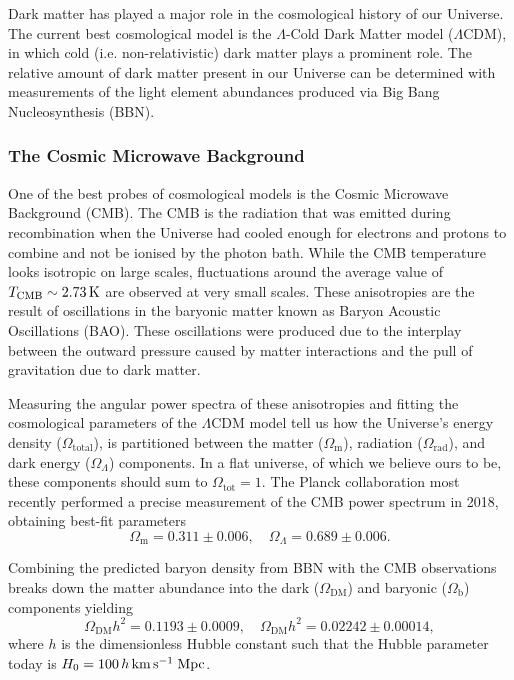 Dark matter has played a major role in the cosmological history of our Universe. The current best cosmological model is the $\Lambda$-Cold Dark Matter model ($\Lambda$CDM), in which cold (i.e. non-relativistic) dark matter plays a prominent role. The relative amount of dark matter present in our Universe can be determined with measurements of the light element abundances produced via Big Bang Nucleosynthesis (BBN).

\subsubsection*{The Cosmic Microwave Background}
One of the best probes of cosmological models is the Cosmic Microwave Background (CMB). The CMB is the radiation that was emitted during recombination when the Universe had cooled enough for electrons and protons to combine and not be ionised by the photon bath. While the CMB temperature looks isotropic on large scales, fluctuations around the average value of $T_\mathrm{CMB} \sim 2.73{\rm \,K}$ are observed at very small scales. 
These anisotropies are the result of oscillations in the baryonic matter known as Baryon Acoustic Oscillations (BAO). These oscillations were produced due to the interplay between the outward pressure caused by matter interactions and the pull of gravitation due to dark matter. 

Measuring the angular power spectra of these anisotropies and fitting the cosmological parameters of the $\Lambda$CDM model tell us how the Universe's energy density ($\Omega_\mathrm{total}$), is partitioned between the matter ($\Omega_\mathrm{m}$), radiation  ($\Omega_\mathrm{rad}$), and dark energy  ($\Omega_\Lambda$) components. In a flat universe, of which we believe ours to be, these components should sum to $\Omega_\mathrm{tot} = 1$.
The Planck collaboration most recently performed a precise measurement of the CMB power spectrum in 2018, obtaining best-fit parameters
\begin{equation}
    \Omega_\mathrm{m} = 0.311 \pm 0.006,\quad \Omega_\Lambda = 0.689 \pm 0.006.
\end{equation}

Combining the predicted baryon density from BBN with the CMB observations breaks down the matter abundance into the dark ($\Omega_\mathrm{DM}$)  and baryonic ($\Omega_\mathrm{b}$) components yielding
\begin{equation}
    \Omega_\mathrm{DM}h^2 = 0.1193 \pm 0.0009,\quad \Omega_\mathrm{DM}h^2 = 0.02242 \pm 0.00014,
\end{equation}
where $h$ is the dimensionless Hubble constant such that the Hubble parameter today is $H_0 = 100\, h{\rm \,km}{\rm \,s}^{-1}\;\mathrm{Mpc}$. 

